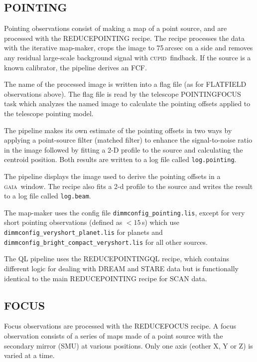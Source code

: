 \documentclass[twoside,11pt]{article}
\renewcommand{\_}{\texttt{\symbol{95}}}
\newcommand{\CUPID}{\textsc{cupid}}
\newcommand{\GAIA}{\textsc{gaia}}
\newcommand{\task}[1]{\textsf{#1}}
\begin{document}
\subsection{POINTING}

Pointing observations consist of making a map of a point source, and
are processed with the \task{REDUCE\_POINTING} recipe. The recipe
processes the data with the iterative map-maker, crops the image to
75\,arcsec on a side and removes any residual large-scale background
signal with \CUPID\ \task{findback}. If the source is a known
calibrator, the pipeline derives an FCF.

The name of the processed image is written into a flag file (as for
FLATFIELD observations above). The flag file is read by the telescope
POINTING\_FOCUS task which analyzes the named image to calculate the
pointing offsets applied to the telescope pointing model.

The pipeline makes its own estimate of the pointing offsets in two
ways by applying a point-source filter (matched filter) to enhance the
signal-to-noise ratio in the image followed by fitting a 2-D profile
to the source and calculating the centroid position. Both results are
written to a log file called \verb+log.pointing+.

The pipeline displays the image used to derive the pointing offsets in
a \GAIA\ window. The recipe also fits a 2-d profile to the source and
writes the result to a log file called \verb+log.beam+.

The map-maker uses the config file \verb+dimmconfig_pointing.lis+,
except for very short pointing observations (defined as $<15$\,s)
which use \verb+dimmconfig_veryshort_planet.lis+ for planets and
\verb+dimmconfig_bright_compact_veryshort.lis+ for all other sources.

The QL pipeline uses the \task{REDUCE\_POINTING\_QL} recipe, which
contains different logic for dealing with DREAM and STARE data but is
functionally identical to the main \task{REDUCE\_POINTING} recipe for
SCAN data.

\subsection{FOCUS}

Focus observations are processed with the \task{REDUCE\_FOCUS}
recipe. A focus observation consists of a series of maps made of a
point source with the secondary mirror (SMU) at various
positions. Only one axis (eother X, Y or Z) is varied at a time.
\end{document}
